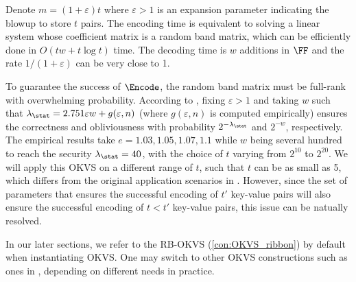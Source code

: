 Denote $m=(1+\varepsilon)t$ where $\varepsilon>1$ is an expansion parameter indicating the blowup to store $t$ pairs. The encoding time is equivalent to solving a linear system whose coefficient matrix is a random band matrix, which can be efficiently done in $O(tw+t\log t)$ time. The decoding time is $w$ additions in $\FF$ and the rate $1/(1+\varepsilon)$ can be very close to 1. 

To guarantee the success of $\Encode$, the random band matrix must be full-rank with overwhelming probability. According to \cite{cryptoeprint:2023/903}, fixing $\varepsilon>1$ and taking $w$ such that $\lambda_\stat = 2.751\varepsilon w+g(\varepsilon,n)$ (where $g(\varepsilon,n)$ is computed empirically) ensures the correctness and obliviousness with probability $2^{-\lambda_\stat}$ and $2^{-w}$, respectively. The empirical results take $e=1.03,1.05,1.07,1.1$ while $w$ being several hundred to reach the security $\lambda_\stat=40$, with the choice of $t$ varying from $2^{10}$ to $2^{20}$. We will apply this OKVS on a different range of $t$, such that $t$ can be as small as 5, which differs from the original application scenarios in \cite{cryptoeprint:2023/903}. However, since the set of parameters that ensures the successful encoding of $t'$ key-value pairs will also ensure the successful encoding of $t<t'$ key-value pairs, this issue can be natually resolved. %

In our later sections, we refer to the RB-OKVS (\cref{con:OKVS_ribbon}) by default when instantiating OKVS. One may switch to other OKVS constructions such as ones in \cite{cryptoeprint:2021/883,cryptoeprint:2022/320}, depending on different needs in practice. 